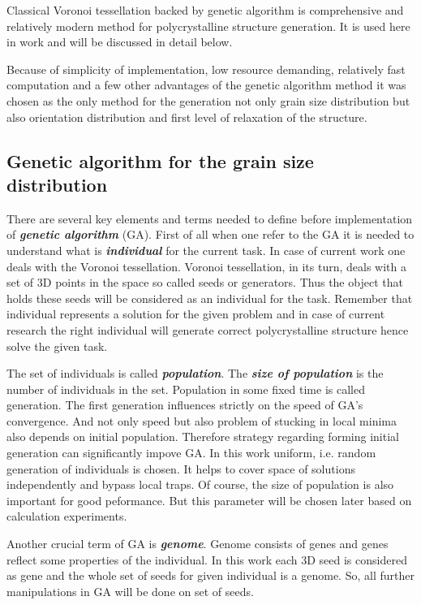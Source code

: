 \documentclass[12pt]{report}
\begin{document}
Classical Voronoi tessellation backed by genetic algorithm is comprehensive and relatively modern method for polycrystalline structure generation. It is used here in work and will be discussed in detail below.

Because of simplicity of implementation, low resource demanding, relatively fast computation and a few other advantages of the genetic algorithm method it was chosen as the only method for the generation not only grain size distribution but also orientation distribution and first level of relaxation of the structure. 

\subsection{Genetic algorithm for the grain size distribution}

There are several key elements and terms needed to define before implementation of \textit{\textbf{genetic algorithm}} (GA). First of all when one refer to the GA it is needed to understand what is \textit{\textbf{individual}} for the current task. In case of current work one deals with the Voronoi tessellation. Voronoi tessellation, in its turn, deals with a set of 3D points in the space so called seeds or generators. Thus the object that holds these seeds will be considered as an individual for the task. Remember that individual represents a solution for the given problem and in case of current research the right individual will generate correct polycrystalline structure hence solve the given task.

The set of individuals is called \textit{\textbf{population}}. The \textit{\textbf{size of population}} is the number of individuals in the set. Population in some fixed time is called generation. The first generation influences strictly on the speed of GA's convergence. And not only speed but also problem of stucking in local minima also depends on initial population. Therefore strategy regarding forming initial generation can significantly impove GA. In this work uniform, i.e. random generation of individuals is chosen. It helps to cover space of solutions independently and bypass local traps. Of course, the size of population is also important for good peformance. But this parameter will be chosen later based on calculation experiments.

Another crucial term of GA is \textit{\textbf{genome}}. Genome consists of genes and genes reflect some properties of the individual. In this work each 3D seed is considered as gene and the whole set of seeds for given individual is a genome. So, all further manipulations in GA will be done on set of seeds.
\end{document}
